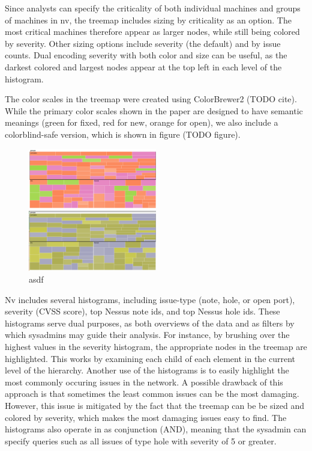 \documentclass{acm_proc_article-sp}
\begin{document}
Since analysts can specify the criticality of both individual machines and groups of machines in nv, the treemap includes sizing by criticality as an option.
The most critical machines therefore appear as larger nodes, while still being colored by severity.
Other sizing options include severity (the default) and by issue counts.
Dual encoding severity with both color and size can be useful, as the darkest colored and largest nodes appear at the top left in each level of the histogram.

The color scales in the treemap were created using ColorBrewer2 (TODO cite).
While the primary color scales shown in the paper are designed to have semantic meanings (green for fixed, red for new, orange for open), we also include a colorblind-safe version, which is shown in figure (TODO figure).


\begin{figure}
  \centering
  \includegraphics[width=0.5\textwidth]{../screenshots/cb_version_both}
  \caption{asdf}
\end{figure}

Nv includes several histograms, including issue-type (note, hole, or open port), severity (CVSS score), top Nessus note ids, and top Nessus hole ids.
These histograms serve dual purposes, as both overviews of the data and as filters by which sysadmins may guide their analysis.
For instance, by brushing over the highest values in the severity histogram, the appropriate nodes in the treemap are highlighted.
This works by examining each child of each element in the current level of the hierarchy.
Another use of the histograms is to easily highlight the most commonly occuring issues in the network.
A possible drawback of this approach is that sometimes the least common issues can be the most damaging.
However, this issue is mitigated by the fact that the treemap can be be sized and colored by severity, which makes the most damaging issues easy to find.
The histograms also operate in as conjunction (AND), meaning that the sysadmin can specify queries such as all issues of type hole with severity of 5 or greater.
\end{document}
